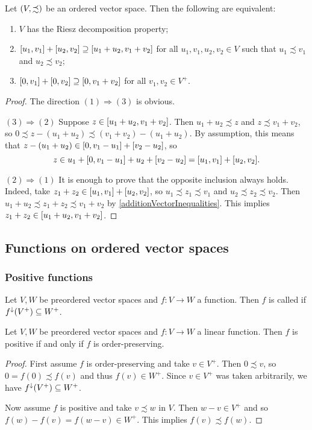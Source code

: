 \begin{lemma} \label{RieszDecompositionLemma}
Let $\sSet{V, \precsim}$ be an ordered vector space. Then the following are equivalent:
\begin{enumerate}
\item $V$ has the Riesz decomposition property;
\item $\interval{u_1,v_1} + \interval{u_2,v_2} \supseteq \interval{u_1+u_2,v_1+v_2}$ for all $u_1,v_1,u_2,v_2\in V$ such that $u_1\precsim v_1$ and $u_2\precsim v_2$;
\item $\interval{0,v_1} + \interval{0,v_2} \supseteq \interval{0,v_1+v_2}$ for all $v_1,v_2\in V^+$.
\end{enumerate}
\end{lemma}
\begin{proof}
The direction $(1) \Rightarrow (3)$ is obvious.

$(3) \Rightarrow (2)$ Suppose $z\in \interval{u_1+u_2,v_1+v_2}$. Then $u_1+u_2 \precsim z$ and $z\precsim v_1+v_2$, so $0\precsim z - (u_1+u_2) \precsim (v_1+v_2) - (u_1+u_2)$. By assumption, this means that $z - (u_1+u_2)\in \interval{0, v_1 - u_1} + \interval{v_2 - u_2}$, so
\[ z \in u_1 + \interval{0, v_1 - u_1} + u_2 + \interval{v_2 - u_2} = \interval{u_1,v_1} + \interval{u_2,v_2}. \]

$(2) \Rightarrow (1)$ It is enough to prove that the opposite inclusion always holds. Indeed, take $z_1 + z_2 \in \interval{u_1,v_1} + \interval{u_2,v_2}$, so $u_1 \precsim z_1 \precsim v_1$ and $u_2 \precsim z_2 \precsim v_2$. Then $u_1 + u_2 \precsim z_1 + z_2 \precsim v_1 + v_2$ by \ref{additionVectorInequalities}. This implies $z_1+z_2 \in \interval{u_1+u_2,v_1+v_2}$.
\end{proof}

\subsection{Functions on ordered vector spaces}
\subsubsection{Positive functions}
\begin{definition}
Let $V,W$ be preordered vector spaces and $f: V\to W$ a function. Then $f$ is called  if $f^\downarrow(V^+) \subseteq W^+$.
\end{definition}

\begin{lemma} \label{positiveLinearFunctionIsotone}
Let $V,W$ be preordered vector spaces and $f: V\to W$ a linear function. Then $f$ is positive \textup{if and only if} $f$ is order-preserving.
\end{lemma}
\begin{proof}
First assume $f$ is order-preserving and take $v\in V^+$. Then $0\precsim v$, so $0=f(0) \precsim f(v)$ and thus $f(v)\in W^+$. Since $v\in V^+$ was taken arbitrarily, we have $f^\downarrow(V^+) \subseteq W^+$.

Now assume $f$ is positive and take $v\precsim w$ in $V$. Then $w-v \in V^+$ and so $f(w) - f(v) = f(w-v) \in W^+$. This implies $f(v)\precsim f(w)$.
\end{proof}



